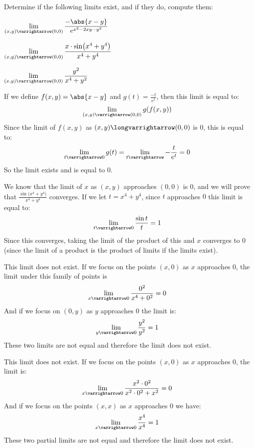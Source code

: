\documentclass[10pt]{article}
\begin{document}


\bigskip

\begin{exercise*}

    Determine if the following limits exist, and if they do, compute them:
    \benum
        \item $\ds\lim_{(x,y)\varrightarrow(0,0)}\frac{-\abs{x-y}}{e^{x^2-2xy-y^2}}$
        \item $\ds\lim_{(x,y)\varrightarrow(0,0)}\frac{x\cdot\sin\bigl(x^4+y^4\bigr)}{x^4+y^4}$
        \item $\ds\lim_{(x,y)\varrightarrow(0,0)}\frac{y^2}{x^4+y^2}$
    \eenum

\end{exercise*}

\begin{blankpp}

    \benum
        \item If we define $f(x,y)=\abs{x-y}$ and $g(t)=\frac{-t}{e^t}$, then this limit is equal
            to:
            \[ \lim_{(x,y)\varrightarrow(0,0)} g(f(x,y)) \]
            Since the limit of $f(x,y)$ as $(x,y)\longvarrightarrow(0,0)$ is $0$, this is equal to:
            \[ \lim_{t\varrightarrow0}g(t) = \lim_{t\varrightarrow}-\frac{t}{e^t} = 0 \]
            So the limit exists and is equal to $0$.
        \item We know that the limit of $x$ as $(x,y)$ approaches $(0,0)$ is $0$, and we will prove
            that $\frac{\sin\bigl(x^4+y^4\bigr)}{x^4+y^4}$ converges.
            If we let $t=x^4+y^4$, since $t$ approaches $0$ this limit is equal to:
            \[ \lim_{t\varrightarrow0}\frac{\sin t}t = 1 \]
            Since this converges, taking the limit of the product of this and $x$ converges to
            $0$ (since the limit of a product is the product of limits if the limits exist).
        \item This limit does not exist.
            If we focus on the points $(x,0)$ as $x$ approaches $0$, the limit under this family
            of points is
            \[ \lim_{x\varrightarrow0}\frac{0^2}{x^4+0^2} = 0 \]
            And if we focus on $(0,y)$ as $y$ approaches $0$ the limit is:
            \[ \lim_{y\varrightarrow0}\frac{y^2}{y^2} = 1 \]
            These two limits are not equal and therefore the limit does not exist.
        \item This limit does not exist.
            If we focus on the points $(x,0)$ as $x$ approaches $0$, the limit is:
            \[ \lim_{x\varrightarrow0}\frac{x^2\cdot0^2}{x^2\cdot0^2+x^2} = 0 \]
            And if we focus on the points $(x,x)$ as $x$ approaches $0$ we have:
            \[ \lim_{x\varrightarrow0}\frac{x^4}{x^4} = 1 \]
            These two partial limits are not equal and therefore the limit does not exist.
    \eenum

\end{blankpp}
\end{document}
